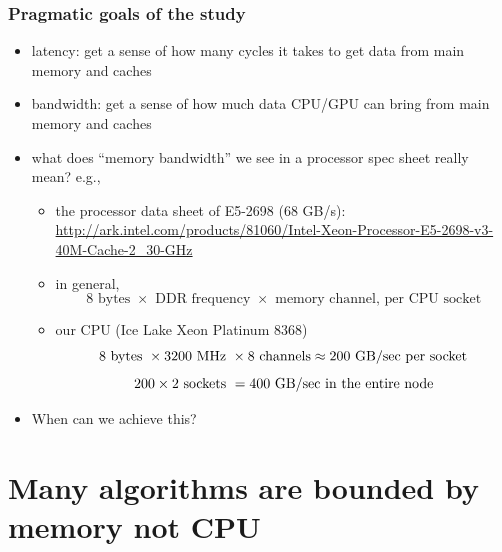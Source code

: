 \documentclass[12pt,dvipdfmx]{beamer}
\newcommand{\ao}[1]{{\color{blue}#1}}
\begin{document}
\begin{frame}
\frametitle{Pragmatic goals of the study}
\begin{itemize}

\item<1-> \ao{latency:} get a sense of how many cycles it takes to get data
  from main memory and caches

\item<2-> \ao{bandwidth:} get a sense of how much data CPU/GPU can bring from main
  memory and caches

\item<3-> what does ``memory bandwidth'' we see in a processor spec sheet really mean? e.g.,

  \begin{itemize}
  \item the processor data sheet of E5-2698 (68 GB/s):
    {\tiny\url{http://ark.intel.com/products/81060/Intel-Xeon-Processor-E5-2698-v3-40M-Cache-2_30-GHz}}
  \item in general,
    \[ 8 \mbox{ bytes } \times \mbox{ DDR frequency } \times
      \mbox{ memory channel, per CPU socket} \]
    
  \item our CPU (Ice Lake Xeon Platinum 8368)
    \[ 8 \mbox{ bytes } \times 3200 \mbox{ MHz } \times 8 \mbox{ channels}
      \approx \ao{200 \mbox{ GB/sec per socket}} \]
    \[ 200 \times 2 \mbox{ sockets } =
      \ao{400 \mbox{ GB/sec in the entire node}} \]

  \end{itemize}

\item<4-> When can we achieve this?
\end{itemize}
\end{frame}

\section{Many algorithms are bounded by memory not CPU}
\end{document}
